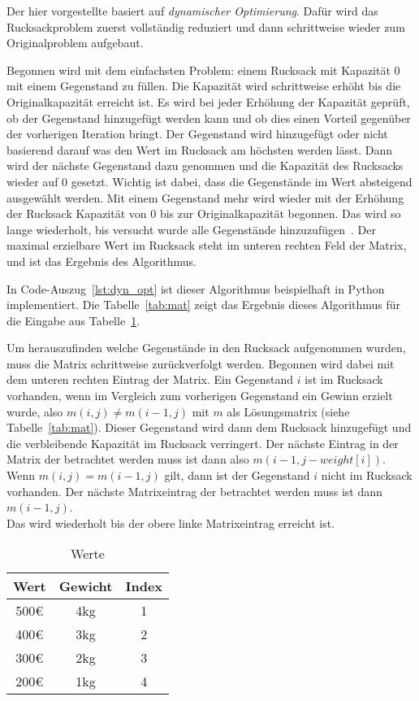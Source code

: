 \documentclass[12pt, a4paper, ngerman]{article}
\begin{document}
Der hier vorgestellte basiert auf \emph{dynamischer Optimierung}.
Dafür wird das Rucksackproblem zuerst vollständig reduziert
und dann schrittweise wieder zum Originalproblem aufgebaut.

Begonnen wird mit dem einfachsten Problem: einem Rucksack mit Kapazität 0 mit einem Gegenstand zu füllen.
Die Kapazität wird schrittweise erhöht bis die Originalkapazität erreicht ist.
Es wird bei jeder Erhöhung der Kapazität geprüft, ob der Gegenstand hinzugefügt werden kann
und ob dies einen Vorteil gegenüber der vorherigen Iteration bringt.
Der Gegenstand wird hinzugefügt oder nicht basierend darauf was den Wert im Rucksack am höchsten werden lässt.
Dann wird der nächste Gegenstand dazu genommen und die Kapazität des Rucksacks wieder auf 0 gesetzt.
Wichtig ist dabei, dass die Gegenstände im Wert absteigend ausgewählt werden.
Mit einem Gegenstand mehr wird wieder mit der Erhöhung der Rucksack Kapazität von 0 bis zur Originalkapazität begonnen.
Das wird so lange wiederholt, bis versucht wurde alle Gegenstände hinzuzufügen~\cite{scheiterhauer2008}.
Der maximal erzielbare Wert im Rucksack steht im unteren rechten Feld der Matrix,
und ist das Ergebnis des Algorithmus.

In Code-Auszug~\ref{lst:dyn_opt} ist dieser Algorithmus beispielhaft in Python implementiert.
Die Tabelle~\ref{tab:mat} zeigt das Ergebnis dieses Algorithmus für die Eingabe aus Tabelle~\ref{tab:input}.

Um herauszufinden welche Gegenstände in den Rucksack aufgenommen wurden,
muss die Matrix schrittweise zurückverfolgt werden.
Begonnen wird dabei mit dem unteren rechten Eintrag der Matrix.
Ein Gegenstand \(i\) ist im Rucksack vorhanden,
wenn im Vergleich zum vorherigen Gegenstand ein Gewinn erzielt wurde,
also \(m(i,j)\neq m(i-1,j)\) mit \(m\) als Lösungsmatrix (siehe Tabelle~\ref{tab:mat}).
Dieser Gegenstand wird dann dem Rucksack hinzugefügt
und die verbleibende Kapazität im Rucksack verringert.
Der nächste Eintrag in der Matrix der betrachtet werden muss
ist dann also \(m(i-1,j-weight[i])\).\\
Wenn \(m(i,j) = m(i-1,j)\) gilt,
dann ist der Gegenstand \(i\) nicht im Rucksack vorhanden.
Der nächste Matrixeintrag der betrachtet werden muss ist dann \(m(i-1,j)\).\\
Das wird wiederholt bis der obere linke Matrixeintrag erreicht ist.


\begin{table}
  \renewcommand{\arraystretch}{1.2}
  \centering
  \begin{tabular}{c|c|c}
    Wert & Gewicht & Index \\
    \hline
    500€ & 4kg     & 1     \\
    400€ & 3kg     & 2     \\
    300€ & 2kg     & 3     \\
    200€ & 1kg     & 4
  \end{tabular}
  \caption{Werte}
  \label{tab:input}
\end{table}
\end{document}
